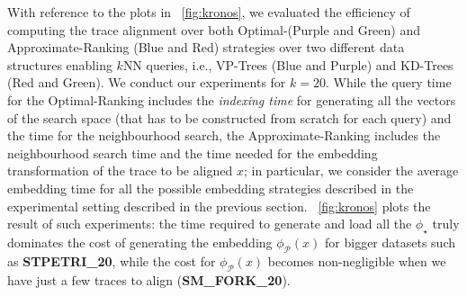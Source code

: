With reference to the plots in \figurename~\ref{fig:kronos}, we evaluated the efficiency of computing the trace alignment over both Optimal-({\color{ggplotPurple}Purple} and {\color{ggplotGreen}Green}) and Approximate-Ranking ({\color{ggplotBlue}Blue} and {\color{ggplotRed}Red}) strategies over two different data structures enabling $k$NN queries, i.e., VP-Trees ({\color{ggplotBlue}Blue} and {\color{ggplotPurple}Purple}) and KD-Trees ({\color{ggplotRed}Red} and {\color{ggplotGreen}Green}). We conduct our experiments for $k=20$. While the query time for the Optimal-Ranking includes the \textit{indexing time} for generating all the vectors of the search space (that has to be constructed from scratch for each query) and the time for the neighbourhood search, the Approximate-Ranking includes the neighbourhood search time and the time needed for the embedding transformation of the trace to be aligned $x$; in particular, we consider the average embedding time for all the possible embedding strategies described in the experimental setting described in the previous section. \figurename~\ref{fig:kronos} plots the result of such experiments: the time required to generate and load all the $\phi_\star$ truly dominates the cost of generating the embedding $\phi_{\mathcal{P}}(x)$ for bigger datasets such as \textbf{STPETRI\_20}, while the cost for $\phi_{\mathcal{P}}(x)$ becomes non-negligible when we have just a few traces to align (\textbf{SM\_FORK\_20}).
